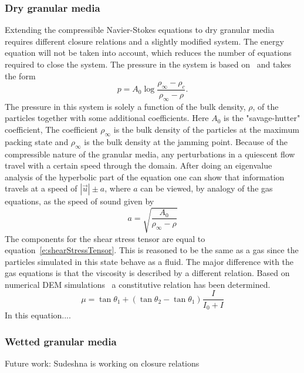 \documentclass{report}
\begin{document}
\subsubsection{Dry granular media}
Extending the compressible Navier-Stokes equations to dry granular media requires different closure relations and a slightly modified system. The energy equation will not be taken into account, which reduces the number of equations required to close the system. The pressure in the system is based on~\cite{} and takes the form
\begin{equation}
\label{e:DryGrainPressure}
p = A_0 \log{\frac{\rho_{\infty} - \rho_c}{\rho_{\infty} - \rho}}.
\end{equation}
The pressure in this system is solely a function of the bulk density, $\rho$, of the particles together with some additional coefficients. Here $A_0$ is the "savage-hutter" coefficient, The coefficient $\rho_{\infty}$ is the bulk density of the particles at the maximum packing state and $\rho_{\infty}$ is the bulk density at the jamming point. 
Because of the compressible nature of the granular media, any perturbations in a quiescent flow travel with a certain speed through the domain. After doing an eigenvalue analysis of the hyperbolic part of the equation one can show that information travels at a speed of $|\vec{u}| \pm a$, where $a$ can be viewed, by analogy of the gas equations, as the speed of sound given by 
\begin{equation}
\label{DryGrainSpeedOfSound}
a = \sqrt{\frac{A_0}{\rho_{\infty} - \rho}}
\end{equation}
The components for the shear stress tensor are equal to equation~\ref{e:shearStressTensor}. This is reasoned to be the same as a gas since the particles simulated in this state behave as a fluid. The major difference with the gas equations is that the viscosity is described by a different relation.
Based on numerical DEM simulations~\cite{} a constitutive relation has been determined.
\begin{equation}
\label{e:DryGrainViscosity}
\mu = \tan{\theta_1} + (\tan{\theta_2} - \tan{\theta_1}) \frac{I}{I_0 + I}
\end{equation}
In this equation....


\subsubsection{Wetted granular media}
Future work: Sudeshna is working on closure relations
\end{document}
